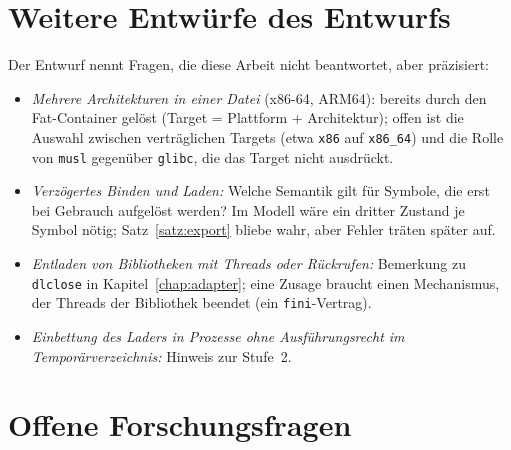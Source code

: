 \section{Weitere Entwürfe des Entwurfs}

Der Entwurf nennt Fragen, die diese Arbeit nicht beantwortet, aber präzisiert:
\begin{itemize}
	\item \emph{Mehrere Architekturen in einer Datei} (x86-64, ARM64): bereits durch den Fat-Container gelöst (Target = Plattform + Architektur); offen ist die Auswahl zwischen verträglichen Targets (etwa \texttt{x86} auf \texttt{x86\_64}) und die Rolle von \texttt{musl} gegenüber \texttt{glibc}, die das Target nicht ausdrückt.
	\item \emph{Verzögertes Binden und Laden:} Welche Semantik gilt für Symbole, die erst bei Gebrauch aufgelöst werden? Im Modell wäre ein dritter Zustand je Symbol nötig; Satz~\ref{satz:export} bliebe wahr, aber Fehler träten später auf.
	\item \emph{Entladen von Bibliotheken mit Threads oder Rückrufen:} Bemerkung zu \texttt{dlclose} in Kapitel~\ref{chap:adapter}; eine Zusage braucht einen Mechanismus, der Threads der Bibliothek beendet (ein \texttt{fini}-Vertrag).
	\item \emph{Einbettung des Laders in Prozesse ohne Ausführungsrecht im Temporärverzeichnis:} Hinweis zur Stufe~2.
\end{itemize}

\section{Offene Forschungsfragen}

